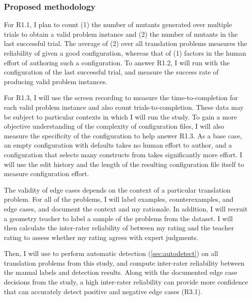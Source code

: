 \subsubsection{Proposed methodology} 

For R1.1, I plan to count (1) the number of mutants generated over multiple trials to obtain a valid problem instance and (2) the number of mutants in the last successful trial. The average of (2) over all translation problems measures the reliability of \Edgeworth given a good configuration, whereas that of (1) factors in the human effort of authoring such a configuration. To answer R1.2, I will run \Edgeworth with the configuration of the last successful trial, and measure the success rate of producing valid problem instances. 

For R1.3, I will use the screen recording to measure the time-to-completion for each valid problem instance and also count trials-to-completion. These data may be subject to particular contexts in which I will run the study. To gain a more objective understanding of the complexity of configuration files, I will also measure the specificity of the configuration to help answer R1.3. As a base case, an empty configuration with defaults takes no human effort to author, and a configuration that selects many constructs from \Domain takes significantly more effort. I will use the edit history and the length of the resulting configuration file itself to measure configuration effort.

The validity of edge cases depends on the context of a particular translation problem.  For all of the problems, I will label examples, counterexamples, and edge cases, and document the context and my rationale.  In addition, I will recruit a geometry teacher to label a sample of the problems from the dataset. I will then calculate the inter-rater reliability of between my rating and the teacher rating to assess whether my rating agrees with expert judgments. 

Then, I will use \Edgeworth to perform automatic detection (\cref{sec:autodetect}) on all translation problems from this study, and compute inter-rater reliability between the manual labels and detection results. Along with the documented edge case decisions from the study, a high inter-rater reliability can provide more confidence that \Edgeworth can accurately detect positive and negative edge cases (R3.1). 

